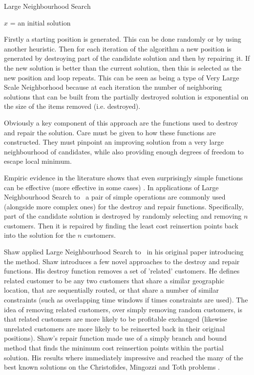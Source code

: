 \begin{algorithm}
   \caption{Large Neighbourhood Search}
   $x$ = an initial solution\\
\end{algorithm}

Firstly a starting position is generated. This can be done randomly or by using another heuristic. Then for each iteration of the algorithm a new position is generated by destroying part of the candidate solution and then by repairing it. If the new solution is better than the current solution, then this is selected as the new position and loop repeats. This can be seen as being a type of Very Large Scale Neighborhood because at each iteration the number of neighboring solutions that can be built from the partially destroyed solution is exponential on the size of the items removed (i.e. destroyed).

Obviously a key component of this approach are the functions used to destroy and repair the solution. Care must be given to how these functions are constructed. They must pinpoint an improving solution from a very large neighbourhood of candidates, while also providing enough degrees of freedom to escape local minimum.

Empiric evidence in the literature shows that even surprisingly simple functions can be effective (more effective in some cases) \cite{Shaw:1998}\cite{Ropke:2005}. In applications of Large Neighbourhood Search to \VRP\ a pair of simple operations are commonly used (alongside more complex ones) for the destroy and repair functions. Specifically, part of the candidate solution is destroyed by randomly selecting and removing $n$ customers. Then it is repaired by finding the least cost reinsertion points back into the solution for the $n$ customers.

Shaw applied Large Neighbourhood Search to \VRP\ in his original paper introducing the method\cite{Shaw:1998}. Shaw introduces a few novel approaches to the destroy and repair functions. His destroy function removes a set of 'related' customers. He defines related customer to be any two customers that share a similar geographic location, that are sequentially routed, or that share a number of similar constraints (such as overlapping time windows if times constraints are used). The idea of removing related customers, over simply removing random customers, is that related customers are more likely to be profitable exchanged (likewise unrelated customers are more likely to be reinserted back in their original positions). Shaw's repair function made use of a simply branch and bound method that finds the minimum cost reinsertion points within the partial solution. His results where immediately impressive and reached the many of the best known solutions on the Christofides, Mingozzi and Toth problems \cite{CMT:1981}.

